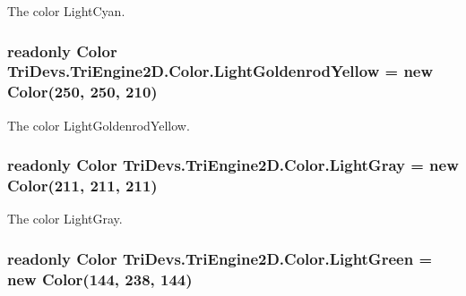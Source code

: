 The color Light\-Cyan. 

\hypertarget{struct_tri_devs_1_1_tri_engine2_d_1_1_color_afa870652dc63537ba76226b8e98171eb}{
\subsubsection[{Light\-Goldenrod\-Yellow}]{\setlength{\rightskip}{0pt plus 5cm}readonly {\bf Color} Tri\-Devs.\-Tri\-Engine2\-D.\-Color.\-Light\-Goldenrod\-Yellow = new {\bf Color}(250, 250, 210)\hspace{0.3cm}{\ttfamily [static]}}}\label{struct_tri_devs_1_1_tri_engine2_d_1_1_color_afa870652dc63537ba76226b8e98171eb}


The color Light\-Goldenrod\-Yellow. 

\hypertarget{struct_tri_devs_1_1_tri_engine2_d_1_1_color_a19abb41d6b8275c2ed879f11d2145e56}{
\subsubsection[{Light\-Gray}]{\setlength{\rightskip}{0pt plus 5cm}readonly {\bf Color} Tri\-Devs.\-Tri\-Engine2\-D.\-Color.\-Light\-Gray = new {\bf Color}(211, 211, 211)\hspace{0.3cm}{\ttfamily [static]}}}\label{struct_tri_devs_1_1_tri_engine2_d_1_1_color_a19abb41d6b8275c2ed879f11d2145e56}


The color Light\-Gray. 

\hypertarget{struct_tri_devs_1_1_tri_engine2_d_1_1_color_a1263330cbc9bcb2e0219d4b96c91b25e}{
\subsubsection[{Light\-Green}]{\setlength{\rightskip}{0pt plus 5cm}readonly {\bf Color} Tri\-Devs.\-Tri\-Engine2\-D.\-Color.\-Light\-Green = new {\bf Color}(144, 238, 144)\hspace{0.3cm}{\ttfamily [static]}}}\label{struct_tri_devs_1_1_tri_engine2_d_1_1_color_a1263330cbc9bcb2e0219d4b96c91b25e}


